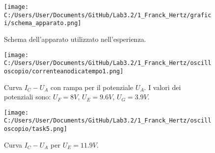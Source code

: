 \documentclass[a4paper,10pt]{article}
\begin{document}
\begin{figure}[h!]
	\centering
		\texttt{[image: C:/Users/User/Documents/GitHub/Lab3.2/1\_Franck\_Hertz/grafici/schema\_apparato.png]}
	\caption{Schema dell'apparato utilizzato nell'esperienza.}
	\label{circuito}
\end{figure}


\begin{figure}[h!]
	\centering
		\texttt{[image: C:/Users/User/Documents/GitHub/Lab3.2/1\_Franck\_Hertz/oscilloscopio/correnteanodicatempo1.png]}
	\caption{Curva $I_{C} - U_{A}$ con rampa per il potenziale $U_{A}$. I valori dei potenziali sono: $U_{F}=8V$, $U_{E}=9.6V$, $U_{G}=3.9V$.}
	\label{andamento}
\end{figure}


\begin{figure}[h!]
	\centering
		\texttt{[image: C:/Users/User/Documents/GitHub/Lab3.2/1\_Franck\_Hertz/oscilloscopio/task5.png]}
	\caption{Curva $I_{C} - U_{A}$ per $U_{E}=11.9V$.}
	\label{task5}
\end{figure}
\end{document}
